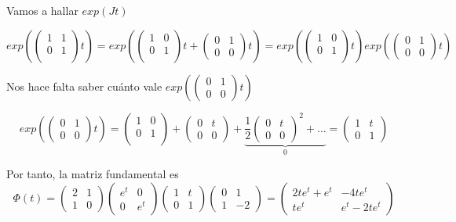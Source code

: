 \begin{example}
Vamos a hallar $exp(Jt)$
\begin{center}
$exp(\begin{pmatrix}
1 & 1\\0 & 1\\
\end{pmatrix}t) = exp(\begin{pmatrix}
1 & 0\\ 0 & 1\\
\end{pmatrix}t+\begin{pmatrix}
0 & 1\\ 0 & 0
\end{pmatrix}t) = exp(\begin{pmatrix}
1 & 0\\ 0 & 1\\
\end{pmatrix}t)exp(\begin{pmatrix}
0 & 1\\ 0 & 0
\end{pmatrix}t)$
\end{center}

Nos hace falta saber cuánto vale $exp(\begin{pmatrix}
0 & 1\\ 0 & 0
\end{pmatrix}t)$

$$exp(\begin{pmatrix}
0 & 1\\ 0 & 0
\end{pmatrix}t) = \begin{pmatrix}
1 & 0 \\ 0 & 1\\
\end{pmatrix} + \begin{pmatrix}
0 & t \\ 0 & 0
\end{pmatrix} + \underbrace{\frac{1}{2}\begin{pmatrix}
0 & t \\ 0 & 0
\end{pmatrix}^2 + \hdots}_0 = \begin{pmatrix}
1 & t\\ 0 & 1
\end{pmatrix}$$

Por tanto, la matriz fundamental es
$$\Phi(t) = \begin{pmatrix}
2 & 1\\1  & 0
\end{pmatrix}\begin{pmatrix}
e^t & 0\\ 0 & e^t
\end{pmatrix}\begin{pmatrix}
1 & t\\ 0 & 1
\end{pmatrix}\begin{pmatrix}
0 & 1\\1 & -2
\end{pmatrix} = \begin{pmatrix}
2te^t+e^t & -4te^t\\te^t& e^t-2te^t
\end{pmatrix}$$
\end{example}

